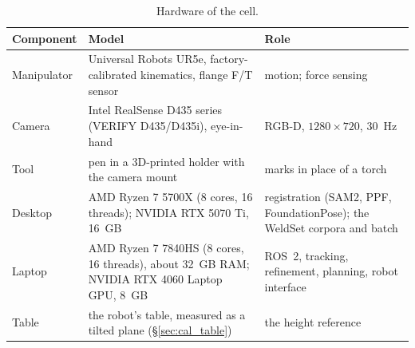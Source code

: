 \begin{table}[htbp]
\caption{Hardware of the cell.}
\label{tab:hardware}
\centering\small
\begin{tabular}{@{}L{0.17\textwidth}L{0.47\textwidth}L{0.28\textwidth}@{}}
\toprule
Component & Model & Role \\
\midrule
Manipulator & Universal Robots UR5e, factory-calibrated kinematics, flange F/T sensor & motion; force sensing \\
Camera & Intel RealSense D435 series (VERIFY D435/D435i), eye-in-hand & RGB-D, $1280\times720$, 30~Hz \\
Tool & pen in a 3D-printed holder with the camera mount & marks in place of a torch \\
Desktop & AMD Ryzen 7 5700X (8 cores, 16 threads); NVIDIA RTX 5070 Ti, 16~GB & registration (SAM2, PPF, FoundationPose); the WeldSet corpora and batch \\
Laptop & AMD Ryzen 7 7840HS (8 cores, 16 threads), about 32~GB RAM; NVIDIA RTX 4060 Laptop GPU, 8~GB & ROS~2, tracking, refinement, planning, robot interface \\
Table & the robot's table, measured as a tilted plane (\S\ref{sec:cal_table}) & the height reference \\
\bottomrule
\end{tabular}
\end{table}

